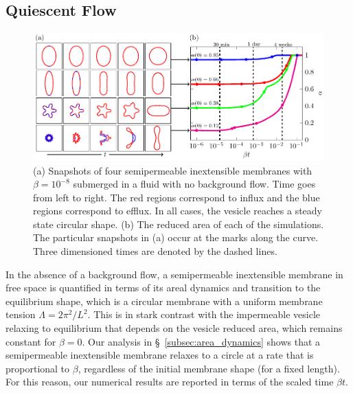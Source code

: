 \documentclass[prb,preprint,showpacs,preprintnumbers,amsmath,amssymb,longbibliography]{revtex4-1}
\newif\ifTikz
\begin{document}
\subsection{Quiescent Flow} 
\begin{figure}[htp]
  \centering
  \ifTikz
  
  \else
  \includegraphics{figures/relaxationComposite.pdf}
  \fi
  \caption{\label{fig:relaxationComposite} (a) Snapshots of four
  semipermeable inextensible membranes with $\beta = 10^{-8}$ submerged
  in a fluid with no background flow. Time goes from left to right. The
  red regions correspond to influx and the blue regions correspond to
  efflux. In all cases, the vesicle reaches a steady state circular
  shape. (b) The reduced area of each of the simulations. The particular
  snapshots in (a) occur at the marks along the curve. Three dimensioned
  times are denoted by the dashed lines.}
\end{figure}
In the absence of a background flow, a semipermeable inextensible
membrane in free space is quantified in terms of its areal dynamics and
transition to the equilibrium shape, which is a circular membrane with a
uniform membrane tension $\Lambda = 2\pi^2/L^2$. This is in stark
contrast with the impermeable vesicle relaxing to equilibrium that
depends on the vesicle reduced area, which remains constant for
$\beta=0$. Our analysis in \S~\ref{subsec:area_dynamics} shows that a
semipermeable inextensible membrane relaxes to a circle at a rate that
is proportional to $\beta$, regardless of the initial membrane shape
(for a fixed length). For this reason, our numerical results are
reported in terms of the scaled time $\beta t$.
\end{document}
